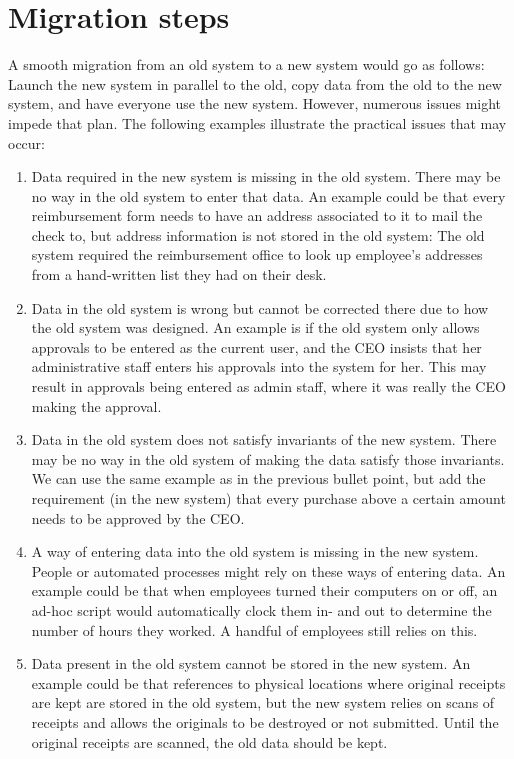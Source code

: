 \documentclass{elsarticle}
\begin{document}
\section{Migration steps}
   A smooth migration from an old system to a new system would go as follows:
   Launch the new system in parallel to the old, copy data from the old to the new system, and have everyone use the new system.
   However, numerous issues might impede that plan.
   The following examples illustrate the practical issues that may occur:
\begin{enumerate}
\item Data required in the new system is missing in the old system.
   There may be no way in the old system to enter that data.
   An example could be that every reimbursement form needs to have an address associated to it to mail the check to, but address information is not stored in the old system:
   The old system required the reimbursement office to look up employee's addresses from a hand-written list they had on their desk.
\item Data in the old system is wrong but cannot be corrected there due to how the old system was designed.
   An example is if the old system only allows approvals to be entered as the current user, and the CEO insists that her administrative staff enters his approvals into the system for her.
   This may result in approvals being entered as admin staff, where it was really the CEO making the approval.
\item Data in the old system does not satisfy invariants of the new system.
   There may be no way in the old system of making the data satisfy those invariants. We can use the same example as in the previous bullet point, but add the requirement (in the new system) that every purchase above a certain amount needs to be approved by the CEO.
\item A way of entering data into the old system is missing in the new system.
   People or automated processes might rely on these ways of entering data.
   An example could be that when employees turned their computers on or off, an ad-hoc script would automatically clock them in- and out to determine the number of hours they worked.
   A handful of employees still relies on this.
\item Data present in the old system cannot be stored in the new system.
   An example could be that references to physical locations where original receipts are kept are stored in the old system, but the new system relies on scans of receipts and allows the originals to be destroyed or not submitted.
   Until the original receipts are scanned, the old data should be kept.
\end{enumerate}
\end{document}
